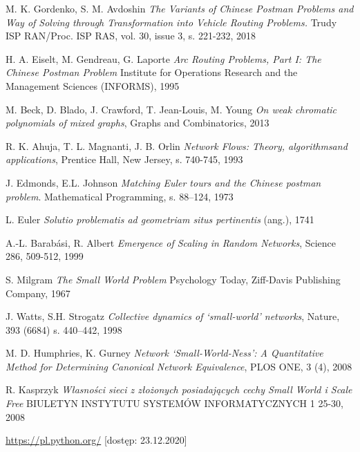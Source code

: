 \documentclass[a4paper, 12pt, twoside, openright]{article}
\begin{document}
\newpage

\begin{thebibliography}{99}
	
		M. K. Gordenko, S. M. Avdoshin \textit{The Variants of Chinese Postman Problems and Way of Solving through Transformation into Vehicle Routing Problems.} Trudy ISP RAN/Proc. ISP RAS, vol. 30, issue 3, s. 221-232, 2018
	
		H. A. Eiselt, M. Gendreau, G. Laporte \textit{Arc Routing Problems, Part I: The Chinese Postman Problem}  Institute for Operations Research and the Management Sciences (INFORMS), 1995
	
		M. Beck, D. Blado, J. Crawford, T. Jean-Louis, M. Young \textit{On weak chromatic polynomials of mixed graphs}, Graphs and Combinatorics, 2013

		R. K. Ahuja, T. L. Magnanti, J. B. Orlin \textit{Network  Flows:  Theory,  algorithmsand applications}, Prentice Hall, New Jersey, s. 740-745, 1993
	
		J. Edmonds, E.L. Johnson \textit{Matching Euler tours and the Chinese postman problem}. Mathematical Programming, s. 88–124, 1973
	
		L. Euler \textit{Solutio problematis ad geometriam situs pertinentis} (ang.), 1741
	
	
	A.-L. Barabási, R. Albert \textit{Emergence of Scaling in Random Networks}, Science 286, 509-512, 1999


	S. Milgram \textit{The Small World Problem} Psychology Today, Ziff-Davis Publishing Company, 1967
	
	J. Watts, S.H. Strogatz \textit{Collective dynamics of ‘small-world’ networks}, Nature, 393 (6684) s. 440–442, 1998	
	
	
	M. D. Humphries, K. Gurney \textit{Network ‘Small-World-Ness’: A Quantitative Method for Determining Canonical Network Equivalence}, PLOS ONE, 3 (4), 2008	
	
	R. Kasprzyk \textit{Własności sieci z złożonych posiadających cechy
	Small World i Scale Free} BIULETYN INSTYTUTU SYSTEMÓW INFORMATYCZNYCH 1 25-30, 2008	

	
	 \href{https://pl.python.org/}{https://pl.python.org/} [dostęp: 23.12.2020]
	

\end{thebibliography}
\end{document}
